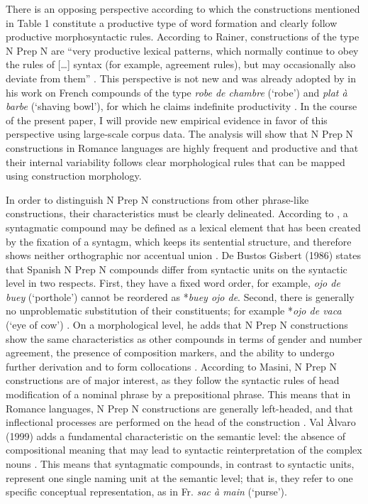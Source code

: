 \documentclass[output=paper]{langsci/langscibook}
\begin{document}
There is an opposing perspective according to which the constructions mentioned in Table 1 constitute a productive type of word formation and clearly follow productive morphosyntactic rules. According to Rainer, constructions of the type N Prep N are “very productive lexical patterns, which normally continue to obey the rules of […] syntax (for example, agreement rules), but may occasionally also deviate from them” \citep[2724]{Rainer:2016}. This perspective is not new and was already adopted by \citet{Benveniste:1974} in his work on French compounds of the type \textit {robe de chambre} (`robe') and \textit {plat à barbe} (`shaving bowl'), for which he claims indefinite productivity \citep[172]{Benveniste:1974}. In the course of the present paper, I will provide new empirical evidence in favor of this perspective using large-scale corpus data. The analysis will show that N Prep N constructions in Romance languages are highly frequent and productive and that their internal variability follows clear morphological rules that can be mapped using construction morphology.

In order to distinguish N Prep N constructions from other phrase-like constructions, their characteristics must be clearly delineated. According to \citet{BuenafuentesdelaMata:2010}, a syntagmatic compound may be defined as a lexical element that has been created by the fixation of a syntagm, which keeps its sentential structure, and therefore shows neither orthographic nor accentual union \citep[21ff.]{BuenafuentesdelaMata:2010}. De Bustos Gisbert (1986) states that Spanish N Prep N compounds differ from syntactic units on the syntactic level in two respects. First, they have a fixed word order, for example, \textit{ojo de buey} (`porthole') cannot be reordered as *\textit {buey ojo de}. Second, there is generally no unproblematic substitution of their constituents; for example *\textit{ojo de vaca} (`eye of cow') \citep[4825]{ValAlvaro:1999}. On a morphological level, he adds that N Prep N constructions show the same characteristics as other compounds in terms of gender and number agreement, the presence of composition markers, and the ability to undergo further derivation and to form collocations \citep[77]{BustosGisbert:1986}. According to Masini, N Prep N constructions are of major interest, as they follow the syntactic rules of head modification of a nominal phrase by a prepositional phrase. This means that in Romance languages, N Prep N constructions are generally left-headed, and that inflectional processes are performed on the head of the construction \citep [257]{Masini:2009}. Val Àlvaro (1999) adds a fundamental characteristic on the semantic level: the absence of compositional meaning that may lead to syntactic reinterpretation of the complex nouns \citep[4827]{ValAlvaro:1999}. This means that syntagmatic compounds, in contrast to syntactic units, represent one single naming unit at the semantic level; that is, they refer to one specific conceptual representation, as in Fr. \textit{sac à main} (`purse').
\end{document}
